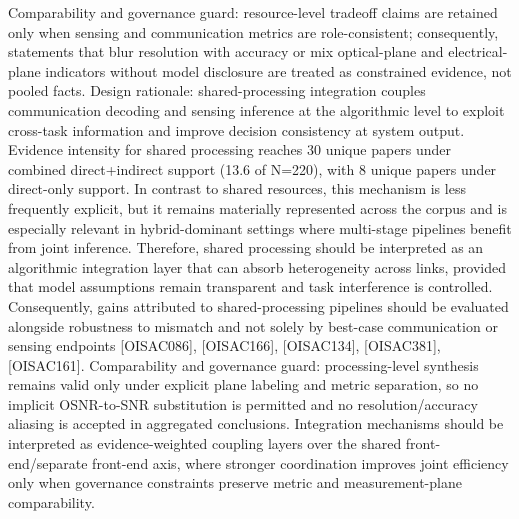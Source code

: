 {}Comparability and governance guard: resource-level tradeoff claims are retained only when sensing and communication metrics are role-consistent; consequently, statements that blur resolution with accuracy or mix optical-plane and electrical-plane indicators without model disclosure are treated as constrained evidence, not pooled facts.\markdownRendererInterblockSeparator
{}
\markdownRendererSectionEnd \markdownRendererSectionBegin
{}\markdownRendererInterblockSeparator
{}Design rationale: shared-processing integration couples communication decoding and sensing inference at the algorithmic level to exploit cross-task information and improve decision consistency at system output.\markdownRendererParagraphSeparator
{}Evidence intensity for shared processing reaches 30 unique papers under combined direct+indirect support (13.6\markdownRendererPercentSign{} of N=220), with 8 unique papers under direct-only support. In contrast to shared resources, this mechanism is less frequently explicit, but it remains materially represented across the corpus and is especially relevant in hybrid-dominant settings where multi-stage pipelines benefit from joint inference. Therefore, shared processing should be interpreted as an algorithmic integration layer that can absorb heterogeneity across links, provided that model assumptions remain transparent and task interference is controlled. Consequently, gains attributed to shared-processing pipelines should be evaluated alongside robustness to mismatch and not solely by best-case communication or sensing endpoints [O\markdownRendererUnderscore{}ISAC\markdownRendererUnderscore{}086], [O\markdownRendererUnderscore{}ISAC\markdownRendererUnderscore{}166], [O\markdownRendererUnderscore{}ISAC\markdownRendererUnderscore{}134], [O\markdownRendererUnderscore{}ISAC\markdownRendererUnderscore{}381], [O\markdownRendererUnderscore{}ISAC\markdownRendererUnderscore{}161].\markdownRendererParagraphSeparator
{}Comparability and governance guard: processing-level synthesis remains valid only under explicit plane labeling and metric separation, so no implicit OSNR-to-SNR substitution is permitted and no resolution/accuracy aliasing is accepted in aggregated conclusions.\markdownRendererParagraphSeparator
{} Integration mechanisms should be interpreted as evidence-weighted coupling layers over the shared front-end/separate front-end axis, where stronger coordination improves joint efficiency only when governance constraints preserve metric and measurement-plane comparability.\markdownRendererInterblockSeparator
